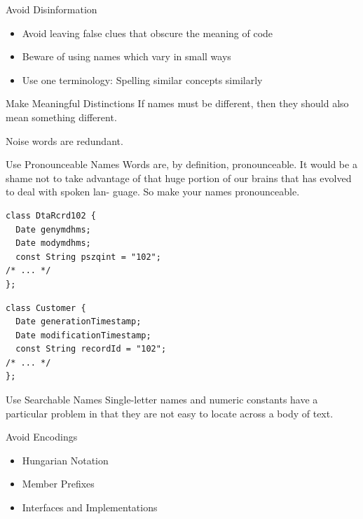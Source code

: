 \documentclass{beamer}
\begin{document}
\begin{frame}{Avoid Disinformation}
\begin{itemize}
  \item Avoid leaving false clues that obscure the meaning of code
  \item Beware of using names which vary in small ways
  \item Use one terminology: Spelling similar concepts similarly
\end{itemize}
\end{frame}

\begin{frame}{Make Meaningful Distinctions}
If names must be different, then they should also mean something different.

Noise words are redundant.
\end{frame}

\begin{frame}[fragile]{Use Pronounceable Names}
Words are, by definition, pronounceable. It would be a shame not to take advantage of that huge portion of our brains that has evolved to deal with spoken lan-
guage. So make your names pronounceable.

\begin{lstlisting}
class DtaRcrd102 {
  Date genymdhms;
  Date modymdhms;
  const String pszqint = "102";
/* ... */
};
\end{lstlisting}

\begin{lstlisting}
class Customer {
  Date generationTimestamp;
  Date modificationTimestamp;
  const String recordId = "102";
/* ... */
};
\end{lstlisting}
\end{frame}

\begin{frame}{Use Searchable Names}
Single-letter names and numeric constants have a particular problem in that they are not
easy to locate across a body of text.
\end{frame}

\begin{frame}{Avoid Encodings}
\begin{itemize}
  \item Hungarian Notation
  \item Member Prefixes
  \item Interfaces and Implementations
\end{itemize}
\end{frame}
\end{document}

